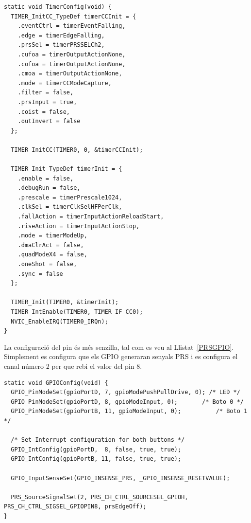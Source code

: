 \begin{lstlisting}[style=customc,caption=Configuració del Timer i l'{\em input capture},label=PRSTimer]
static void TimerConfig(void) {
  TIMER_InitCC_TypeDef timerCCInit = {
    .eventCtrl = timerEventFalling,
    .edge = timerEdgeFalling,
    .prsSel = timerPRSSELCh2,
    .cufoa = timerOutputActionNone,
    .cofoa = timerOutputActionNone,
    .cmoa = timerOutputActionNone,
    .mode = timerCCModeCapture,
    .filter = false,
    .prsInput = true,
    .coist = false,
    .outInvert = false
  };

  TIMER_InitCC(TIMER0, 0, &timerCCInit);

  TIMER_Init_TypeDef timerInit = {
    .enable = false,
    .debugRun = false,
    .prescale = timerPrescale1024,
    .clkSel = timerClkSelHFPerClk,
    .fallAction = timerInputActionReloadStart,
    .riseAction = timerInputActionStop,
    .mode = timerModeUp,
    .dmaClrAct = false,
    .quadModeX4 = false,
    .oneShot = false,
    .sync = false
  };

  TIMER_Init(TIMER0, &timerInit);
  TIMER_IntEnable(TIMER0, TIMER_IF_CC0);
  NVIC_EnableIRQ(TIMER0_IRQn);
}
\end{lstlisting}

La configuració del pin és més senzilla, tal com es veu al Llistat~\ref{PRSGPIO}. Simplement es configura que els GPIO generaran senyals PRS i es configura el canal número 2 per que rebi el valor del pin 8.

\begin{lstlisting}[style=customc,caption=Configuració del GPIO per generar un senyal PRS,label=PRSGPIO]
 static void GPIOConfig(void) {
  GPIO_PinModeSet(gpioPortD, 7, gpioModePushPullDrive, 0); /* LED */
  GPIO_PinModeSet(gpioPortD, 8, gpioModeInput, 0); 		 /* Boto 0 */
  GPIO_PinModeSet(gpioPortB, 11, gpioModeInput, 0); 		 /* Boto 1 */

  /* Set Interrupt configuration for both buttons */
  GPIO_IntConfig(gpioPortD,  8, false, true, true);
  GPIO_IntConfig(gpioPortB, 11, false, true, true);

  GPIO_InputSenseSet(GPIO_INSENSE_PRS, _GPIO_INSENSE_RESETVALUE);

  PRS_SourceSignalSet(2, PRS_CH_CTRL_SOURCESEL_GPIOH, PRS_CH_CTRL_SIGSEL_GPIOPIN8, prsEdgeOff);
}
\end{lstlisting}

